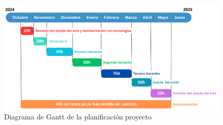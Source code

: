 \begin{figure}[H]
	\centering
	\includegraphics[width=1\linewidth]{"Sprint 0/gantt"}
	\caption{Diagrama de Gantt de la planificación proyecto}
	\label{fig:gantt}
\end{figure}

